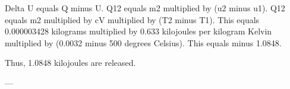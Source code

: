 Delta U equals Q minus U.  
Q12 equals m2 multiplied by (u2 minus u1).  
Q12 equals m2 multiplied by cV multiplied by (T2 minus T1).  
This equals 0.000003428 kilograms multiplied by 0.633 kilojoules per kilogram Kelvin multiplied by (0.0032 minus 500 degrees Celsius).  
This equals minus 1.0848.  

Thus, 1.0848 kilojoules are released.  

---